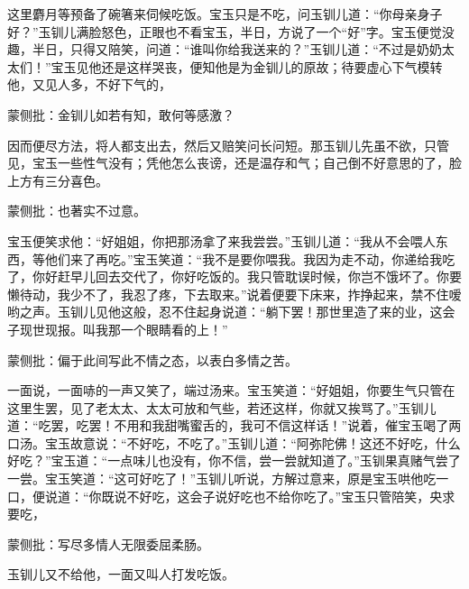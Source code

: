 \begin{parag}


    这里麝月等预备了碗箸来伺候吃饭。宝玉只是不吃，问玉钏儿道：“你母亲身子好？”玉钏儿满脸怒色，正眼也不看宝玉，半日，方说了一个“好”字。宝玉便觉没趣，半日，只得又陪笑，问道：“谁叫你给我送来的？”玉钏儿道：“不过是奶奶太太们！”宝玉见他还是这样哭丧，便知他是为金钏儿的原故；待要虚心下气模转他，又见人多，不好下气的，\begin{note}蒙侧批：金钏儿如若有知，敢何等感激？\end{note}因而便尽方法，将人都支出去，然后又赔笑问长问短。那玉钏儿先虽不欲，只管见，宝玉一些性气没有；凭他怎么丧谤，还是温存和气；自己倒不好意思的了，脸上方有三分喜色。\begin{note}蒙侧批：也著实不过意。\end{note}宝玉便笑求他：“好姐姐，你把那汤拿了来我尝尝。”玉钏儿道：“我从不会喂人东西，等他们来了再吃。”宝玉笑道：“我不是要你喂我。我因为走不动，你递给我吃了，你好赶早儿回去交代了，你好吃饭的。我只管耽误时候，你岂不饿坏了。你要懒待动，我少不了，我忍了疼，下去取来。”说着便要下床来，拃挣起来，禁不住嗳哟之声。玉钏儿见他这般，忍不住起身说道：“躺下罢！那世里造了来的业，这会子现世现报。叫我那一个眼睛看的上！”\begin{note}蒙侧批：偏于此间写此不情之态，以表白多情之苦。\end{note}一面说，一面哧的一声又笑了，端过汤来。宝玉笑道：“好姐姐，你要生气只管在这里生罢，见了老太太、太太可放和气些，若还这样，你就又挨骂了。”玉钏儿道：“吃罢，吃罢！不用和我甜嘴蜜舌的，我可不信这样话！”说着，催宝玉喝了两口汤。宝玉故意说：“不好吃，不吃了。”玉钏儿道：“阿弥陀佛！这还不好吃，什么好吃？”宝玉道：“一点味儿也没有，你不信，尝一尝就知道了。”玉钏果真赌气尝了一尝。宝玉笑道：“这可好吃了！”玉钏儿听说，方解过意来，原是宝玉哄他吃一口，便说道：“你既说不好吃，这会子说好吃也不给你吃了。”宝玉只管陪笑，央求要吃，\begin{note}蒙侧批：写尽多情人无限委屈柔肠。\end{note}玉钏儿又不给他，一面又叫人打发吃饭。
\end{parag}



